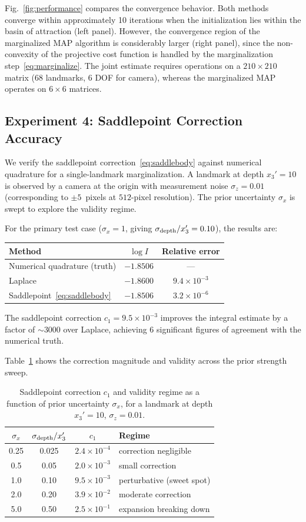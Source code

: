 \documentclass[journal]{IEEEtran}
\begin{document}
Fig.~\ref{fig:performance} compares the convergence behavior.
Both methods converge within approximately 10 iterations when 
the initialization lies within the basin of attraction (left panel).
However, the convergence region of the marginalized MAP algorithm 
is considerably larger (right panel), since the non-convexity 
of the projective cost function is handled by the 
marginalization step~\eqref{eq:marginalize}. The joint estimate 
requires operations on a $210 \times 210$ matrix (68 landmarks, 
6 DOF for camera), whereas the marginalized MAP operates on 
$6 \times 6$ matrices.
 
\subsection{Experiment 4: Saddlepoint Correction Accuracy}
 
We verify the saddlepoint correction~\eqref{eq:saddlebody}
against numerical quadrature for a single-landmark
marginalization. A landmark at depth $x_3' = 10$ is observed
by a camera at the origin with measurement noise
$\sigma_z = 0.01$ (corresponding to $\pm 5$~pixels at 
$512$-pixel resolution). The prior uncertainty $\sigma_x$
is swept to explore the validity regime.
 
For the primary test case ($\sigma_x = 1$, giving
$\sigma_{\rm depth}/x_3' = 0.10$), the results are:
\begin{center}
\begin{tabular}{l|c|c}
Method & $\log I$ & Relative error \\
\hline
Numerical quadrature (truth) & $-1.8506$ & --- \\
Laplace & $-1.8600$ & $9.4 \times 10^{-3}$ \\
Saddlepoint~\eqref{eq:saddlebody} & $-1.8506$ & $3.2 \times 10^{-6}$
\end{tabular}
\end{center}
The saddlepoint correction $c_1 = 9.5 \times 10^{-3}$
improves the integral estimate by a factor of $\sim\! 3000$
over Laplace, achieving 6 significant figures of agreement
with the numerical truth.
 
Table~\ref{tab:spregime} shows the correction magnitude
and validity across the prior strength sweep.
\begin{table}[t]
\centering
\caption{Saddlepoint correction $c_1$ and validity regime
as a function of prior uncertainty $\sigma_x$,
for a landmark at depth $x_3' = 10$, $\sigma_z = 0.01$.}
\label{tab:spregime}
\begin{tabular}{c|c|c|l}
$\sigma_x$ & $\sigma_{\rm depth}/x_3'$ & $c_1$ & Regime \\
\hline
0.25 & 0.025  & $2.4\times10^{-4}$ & correction negligible \\
0.5  & 0.05   & $2.0\times10^{-3}$ & small correction \\
1.0  & 0.10   & $9.5\times10^{-3}$ & perturbative (sweet spot) \\
2.0  & 0.20   & $3.9\times10^{-2}$ & moderate correction \\
5.0  & 0.50   & $2.5\times10^{-1}$ & expansion breaking down
\end{tabular}
\end{table}
 
\end{document}

